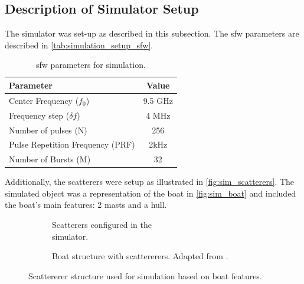 \documentclass[class=report,11pt,crop=false]{standalone}
\begin{document}
    \subsection{Description of Simulator Setup} \label{subsec:suimulation_setup}
    The simulator was set-up as described in this subsection. The \gls{sfw} parameters are described in \autoref{tab:simulation_setup_sfw}.
    
    \begin{table}[H]
        \centering
        \begin{tabular}{|l|c|}
            \hline
            \textbf{Parameter} & \textbf{Value}\\
            \hline
            Center Frequency ($f_0$) & 9.5 GHz\\
            \hline
            Frequency step ($\delta f$)& 4 MHz \\
            \hline
            Number of pulses (N) &  256 \\
            \hline
            Pulse Repetition Frequency (PRF) & 2kHz \\
            \hline
            Number of Bursts (M) & 32 \\
            \hline
        \end{tabular}
        \caption{\gls{sfw} parameters for simulation.}\label{tab:simulation_setup_sfw}
    \end{table}

    Additionally, the scatterers were setup as illustrated in \autoref{fig:sim_scatterers}. The simulated object was a representation of the boat in \autoref{fig:sim_boat} and included the boat's main features: 2 masts and a hull. 
    
    \begin{figure}[H]
        \centering
        \begin{subfigure}{0.4\linewidth}
            \centering
            \resizebox{\linewidth}{!}{}
            \caption{Scatterers configured in the\\ simulator.}\label{fig:sim_scatterers}
        \end{subfigure}
        \hspace{1cm}
        \begin{subfigure}{0.4\linewidth}
            \centering
            \resizebox{\linewidth}{!}{}
            \caption{Boat structure with scattererers. Adapted from \cite{boat}. }\label{fig:sim_boat}
        \end{subfigure}
        \caption{Scattererer structure used for simulation based on boat features. }
    \end{figure}
\end{document}
